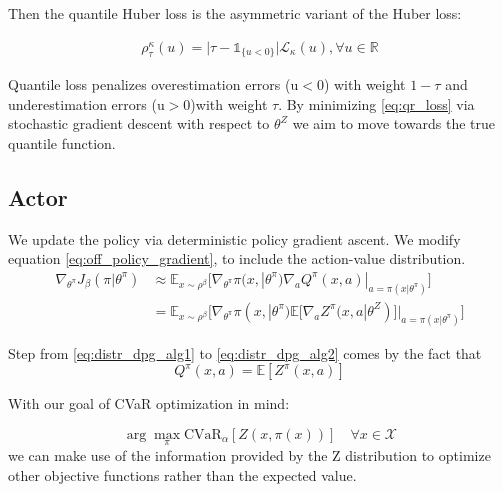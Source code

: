 Then the quantile Huber loss is the asymmetric variant of the Huber loss:

\begin{align}
    \rho_\tau^\kappa(u)=\Big|\tau - \mathds{1}_{\{u<0\}}\Big|\mathcal{L}_\kappa(u) , \forall u \in \mathbb{R}
\end{align}

Quantile loss penalizes overestimation errors (u$<$0) with weight $1-\tau$ and underestimation
errors (u$>$0)with weight $\tau$.
By minimizing \ref{eq:qr_loss} via stochastic gradient descent with respect to $\theta^Z$
we aim to move towards the true quantile function. 

\subsection{Actor}
We update the policy via deterministic policy gradient ascent.
We modify equation \eqref{eq:off_policy_gradient}, to include the action-value distribution.
\begin{align}
    \nabla_{\theta^\pi} J_\beta(\pi | \theta^\pi) &\approx \mathbb E_{x \sim \rho^\beta} 
    \big [\nabla_{\theta^\pi} \pi(x,| \theta^\pi) \nabla_a Q^{\pi}(x,a)|_{a=\pi(x| \theta^\pi)}  \big]\label{eq:distr_dpg_alg1}\\
    &=\mathbb E_{x \sim \rho^\beta} 
    \big [\nabla_{\theta^\pi} \pi(x,| \theta^\pi) \mathbb E [\nabla_a Z^\pi(x,a | \theta^Z)]|_{a=\pi(x| \theta^\pi)}  \big]
    \label{eq:distr_dpg_alg2}
\end{align}


Step from \eqref{eq:distr_dpg_alg1} to \eqref{eq:distr_dpg_alg2} comes by the fact that
\begin{equation}
    Q^\pi(x,a) = \mathbb E[Z^\pi(x,a)] \label{eq:neutral_policy}
\end{equation}

With our goal of CVaR optimization in mind:

\begin{equation}
     \arg \underset{\pi}\max \text{CVaR}_\alpha [Z (x, \pi(x))] \quad \forall x \in \mathcal{X}
\end{equation}
we can make use of the information provided by the Z distribution to 
optimize other objective functions rather than the expected value.

